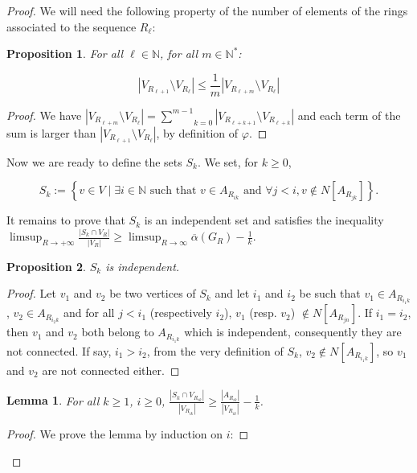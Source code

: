 \documentclass{amsart}                     %
\newtheorem{lemm}{Lemma}
\newtheorem{prop}{Proposition}
\begin{document}
\begin{proof}
We will need the following property of the number of elements of the rings associated to the sequence $R_\ell$:

\begin{prop}
For all $\ell\in \mathbb N$, for all $m\in\mathbb N^{\ast}$:

\[ |V_{R_{\ell+1}}\setminus V_{R_{\ell}}|\leq \frac 1 m |V_{R_{\ell+m}}\setminus V_{R_{\ell}}|\]
\label{1i}
\end{prop}

\begin{proof}
We have $|V_{R_{\ell+m}}\setminus V_{R_{\ell}}|=\underset{k=0}{\overset {m-1} {\sum}} |V_{R_{\ell+k+1}}\setminus V_{R_{\ell+k}}|$ and each term of the sum is larger than $|V_{R_{\ell+1}}\setminus V_{R_{\ell}}|$, by definition of $\varphi$.
\end{proof}

Now we are ready to define the sets $S_k$. We set, for $k\geq 0$,

\[S_k:=\left\{v\in V\mid \exists i\in\mathbb N\text{ such that }v\in A_{R_{ik}}\text{ and }\forall j<i, v\notin N[A_{R_{jk}}]
\right\}.\]

It remains to prove that $S_k$ is an independent set and satisfies the inequality  $\limsup_{R\to+\infty} \frac{|S_k\cap V_R|}{|V_R|}\geq \limsup_{R\to\infty}\overline{\alpha} (G_R) -\frac 1 k$.
\vspace{0.35cm}
\begin{prop} 
$S_k$ is independent. 
\end{prop}

\begin{proof}
Let $v_1$ and $v_2$ be two vertices of $S_k$ and let $i_1$ and $i_2$ be such that $v_1\in A_{R_{i_1k}}$, $v_2\in A_{R_{i_2k}}$ and for all $j<i_1$ (respectively $i_2$), $v_1$ (resp. $v_2$) $\notin N[A_{R_{jn}}]$. 
If $i_1=i_2$, then $v_1$ and $v_2$ both belong to $A_{R_{i_1k}}$ which is independent, consequently they are not connected. If say, $i_1>i_2$, from the very definition of $S_k$, $v_2\notin N[A_{R_{i_1k}}]$, so $v_1$ and $v_2$ are not connected either.
\end{proof}

\begin{lemm}\label{induc}
For all $k\geq 1$, $i\geq 0$, $\frac{|S_k\cap V_{R_{ik}}|}{|V_{R_{ik}}|}\geq \frac{|A_{R_{ik}}|}{|V_{R_{ik}}|}-\frac 1 k$.
\end{lemm}

\begin{proof}
 We prove the lemma by induction on $i$:
 

\end{proof}
\end{proof}
\end{document}
